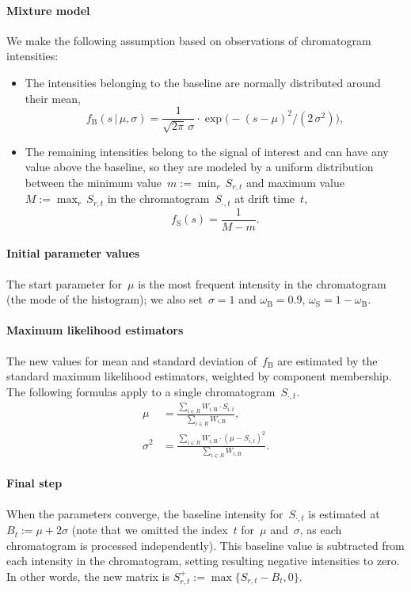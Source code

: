\documentclass{article}
\newcommand{\given}{\,|\,}
\begin{document}
\paragraph{Mixture model}
We make the following assumption based on observations of chromatogram intensities:
\begin{itemize}
\item The intensities belonging to the baseline are normally distributed around their mean,
\[ f_\text{B}(s \given \mu, \sigma)
   = \frac{1}{\sqrt{2 \pi}\, \sigma} \cdot \exp \big(-(s - \mu)^2 / (2\,\sigma^2) \big),
\]
\item The remaining intensities belong to the signal of interest and can have any value above the baseline, so they are modeled by a uniform distribution between the minimum value~$m:=\min_r\, S_{r,t}$ and maximum value~$M:=\max_r\, S_{r,t}$ in the chromatogram~$S_{\cdot,t}$ at drift time~$t$,
\[ f_\text{S}(s) = \frac{1}{M-m}.
\]
\end{itemize}

\paragraph*{Initial parameter values}
The start parameter for~$\mu$ is the most frequent intensity in the chromatogram (the mode of the histogram); we also set~$\sigma=1$ and $\omega_\text{B}=0.9$, $\omega_\text{S}=1-\omega_\text{B}$.

\paragraph*{Maximum likelihood estimators}
The new values for mean and standard deviation of~$f_\text{B}$ are estimated by the standard maximum likelihood estimators, weighted by component membership.
The following formulas apply to a single chromatogram~$S_{\cdot,t}$.
\begin{align}
	\mu &= \frac{ \sum_{i\in R} W_{i,\text{B}} \cdot S_{i,t}}{ \sum_{i\in R} W_{i, \text{B}} } 
	\label{equ:mstepmueRC}, \\
\sigma^2 &= \frac{\sum_{i \in R} W_{i,\text{B}} \cdot (\mu - S_{i, t})^2 }{\sum_{i \in R} W_{i,\text{B}}}. 
	\label{equ:mstepsigmaRC}
\end{align}

\paragraph*{Final step}
When the parameters converge, the baseline intensity for~$S_{\cdot,t}$ is estimated at~$B_t := \mu + 2\sigma$ (note that we omitted the index~$t$ for~$\mu$ and~$\sigma$, as each chromatogram is processed independently).
This baseline value is subtracted from each intensity in the chromatogram, setting resulting negative intensities to zero.
In other words, the new matrix is $S^+_{r,t} := \max\{ S_{r,t} - B_t, 0\}$.
\end{document}
